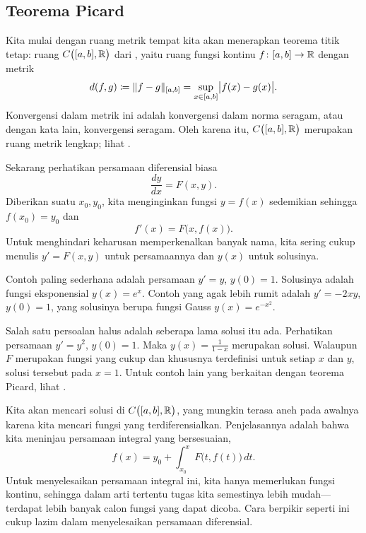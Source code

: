 \subsection{Teorema Picard}

Kita mulai dengan ruang metrik tempat kita akan menerapkan
teorema titik tetap:
ruang $C\bigl([a,b],{\mathbb{R}}\bigr)$ dari ,
yaitu ruang fungsi kontinu $f \colon [a,b] \to {\mathbb{R}}$ dengan metrik
\begin{equation*}
d(f,g) \coloneqq \lVert {f-g} \rVert_{[a,b]} = \sup_{x \in [a,b]} \bigl\lvert {f(x)-g(x)} \bigr\rvert .
\end{equation*}
Konvergensi dalam metrik ini adalah konvergensi dalam norma seragam, atau dengan
kata lain, konvergensi seragam. Oleh karena itu,
$C\bigl([a,b],{\mathbb{R}}\bigr)$ merupakan ruang metrik lengkap;
lihat .

\medskip

Sekarang perhatikan persamaan diferensial biasa
\begin{equation*}
\frac{dy}{dx} = F(x,y) .
\end{equation*}
Diberikan suatu $x_0, y_0$, kita menginginkan fungsi $y=f(x)$ sedemikian sehingga
$f(x_0) = y_0$ dan
\begin{equation*}
f'(x) = F\bigl(x,f(x)\bigr) .
\end{equation*}
Untuk menghindari keharusan memperkenalkan banyak nama, kita sering cukup menulis $y' = F(x,y)$
untuk persamaannya
dan $y(x)$ untuk solusinya.

Contoh paling sederhana adalah persamaan $y' = y$, $y(0) = 1$.
Solusinya adalah fungsi eksponensial $y(x) = e^x$. Contoh yang agak lebih rumit
adalah $y' = -2xy$, $y(0) = 1$, yang solusinya berupa fungsi Gauss
$y(x) = e^{-x^2}$.

Salah satu persoalan halus adalah seberapa lama solusi itu ada.
Perhatikan persamaan $y' = y^2$, $y(0)=1$. Maka $y(x) = \frac{1}{1-x}$ merupakan
solusi. Walaupun $F$ merupakan fungsi yang cukup  dan khususnya
terdefinisi untuk setiap $x$ dan $y$, solusi tersebut  pada $x=1$.
Untuk contoh lain yang berkaitan dengan teorema Picard, lihat .

Kita akan mencari solusi di 
$C\bigl([a,b],{\mathbb{R}}\bigr)$, yang mungkin terasa aneh pada awalnya karena
kita mencari fungsi yang terdiferensialkan.
Penjelasannya adalah bahwa kita meninjau
persamaan integral yang bersesuaian,
\begin{equation*}
f(x)
=
y_0 + \int_{x_0}^x F\bigl(t,f(t)\bigr)\,dt .
\end{equation*}
Untuk menyelesaikan persamaan integral ini, kita hanya memerlukan fungsi kontinu, sehingga
dalam arti tertentu tugas kita semestinya lebih mudah---terdapat lebih banyak calon fungsi
yang dapat dicoba. Cara berpikir seperti ini cukup lazim dalam menyelesaikan persamaan
diferensial.

